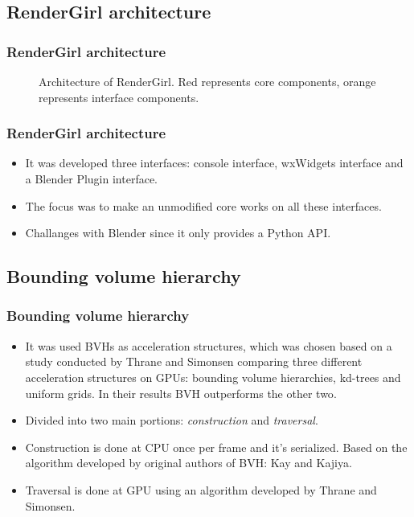 \documentclass{beamer}
\begin{document}
\subsection{RenderGirl architecture}
\begin{frame}
\frametitle{RenderGirl architecture}

\begin{figure}
\centering

\caption{Architecture of RenderGirl. Red represents core components,
  orange represents interface components.}
\label{fig:architecture}
\end{figure}

\end{frame}


\begin{frame}
\frametitle{RenderGirl architecture}
\begin{itemize}
\item It was developed three interfaces: console interface, wxWidgets
  interface and a Blender Plugin interface.
\item The focus was to make an unmodified core works on all these
  interfaces.
\item Challanges with Blender since it only provides a Python API.
\end{itemize}
\end{frame}


\subsection{Bounding volume hierarchy}
\begin{frame}
  \frametitle{Bounding volume hierarchy}
\begin{itemize}
\item It was used BVHs as acceleration structures, which was chosen
  based on a study conducted by Thrane and Simonsen comparing three
  different acceleration structures on GPUs: bounding volume
  hierarchies, kd-trees and uniform grids. In their results BVH
  outperforms the other
  two\cite{Thrane}. %
\item Divided into two main portions: \emph{construction} and \emph{traversal}.
\item Construction is done at CPU once per frame and it's
  serialized. Based on the algorithm developed by original authors of
  BVH: Kay and Kajiya\cite{kay1986ray}.
\item Traversal is done at GPU using an algorithm developed by Thrane
  and Simonsen.
\end{itemize}

\end{frame}
\end{document}
